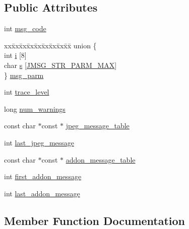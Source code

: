 \subsection*{Public Attributes}
\begin{DoxyCompactItemize}
\item 
int \hyperlink{structjpeg__error__mgr_a27fcf9391530acf9075836c5d11fff00}{msg\+\_\+code}
\item 
\begin{tabbing}
xx\=xx\=xx\=xx\=xx\=xx\=xx\=xx\=xx\=\kill
union \{\\
\>int \hyperlink{structjpeg__error__mgr_a9b91e1ea3b7e8af8d37cb712a72f4597}{i} \mbox{[}8\mbox{]}\\
\>char \hyperlink{structjpeg__error__mgr_a0b335f0919d328a95f02440a4ec2216b}{s} \mbox{[}\hyperlink{jpeglib_8h_abda041041041cc3985c7bb1a32e8b0be}{JMSG\_STR\_PARM\_MAX}\mbox{]}\\
\} \hyperlink{structjpeg__error__mgr_a9366d979c371cc8267be50571e163c30}{msg\_parm}\\

\end{tabbing}\item 
int \hyperlink{structjpeg__error__mgr_a77328bf266cc3c3c4d9741fc27a4ef9b}{trace\+\_\+level}
\item 
long \hyperlink{structjpeg__error__mgr_a6d74f34ca06fd61c9cc2b5818d317255}{num\+\_\+warnings}
\item 
const char $\ast$const $\ast$ \hyperlink{structjpeg__error__mgr_aeaa5c5dc26052bd7e367ceb35f670beb}{jpeg\+\_\+message\+\_\+table}
\item 
int \hyperlink{structjpeg__error__mgr_a01d4d8f17f2d2ad49e5bd981c01296b9}{last\+\_\+jpeg\+\_\+message}
\item 
const char $\ast$const $\ast$ \hyperlink{structjpeg__error__mgr_af327179ad6b8d663a173e25615257e33}{addon\+\_\+message\+\_\+table}
\item 
int \hyperlink{structjpeg__error__mgr_a35a1536b1171bb13510b5156ffa0af05}{first\+\_\+addon\+\_\+message}
\item 
int \hyperlink{structjpeg__error__mgr_a67531ea98e366e64d5b348446d50e806}{last\+\_\+addon\+\_\+message}
\end{DoxyCompactItemize}


\subsection{Member Function Documentation}
\hypertarget{structjpeg__error__mgr_a72c40bceda2e6cb78046165e6892ac3a}{}
